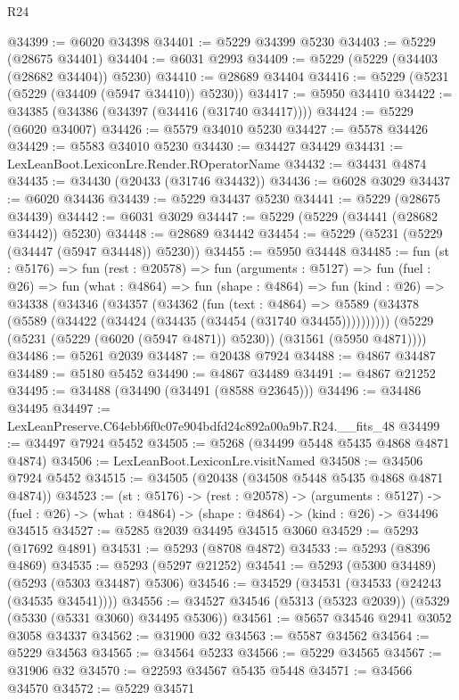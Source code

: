 \begin{lexlean}{R24}
\begin{coremodule}
@34399 := @6020 @34398
@34401 := @5229 @34399 @5230
@34403 := @5229 (@28675 @34401)
@34404 := @6031 @2993
@34409 := @5229 (@5229 (@34403 (@28682 @34404)) @5230)
@34410 := @28689 @34404
@34416 := @5229 (@5231 (@5229 (@34409 (@5947 @34410)) @5230))
@34417 := @5950 @34410
@34422 := @34385 (@34386 (@34397 (@34416 (@31740 @34417))))
@34424 := @5229 (@6020 @34007)
@34426 := @5579 @34010 @5230
@34427 := @5578 @34426
@34429 := @5583 @34010 @5230
@34430 := @34427 @34429
@34431 := LexLeanBoot.LexiconLre.Render.ROperatorName
@34432 := @34431 @4874
@34435 := @34430 (@20433 (@31746 @34432))
@34436 := @6028 @3029
@34437 := @6020 @34436
@34439 := @5229 @34437 @5230
@34441 := @5229 (@28675 @34439)
@34442 := @6031 @3029
@34447 := @5229 (@5229 (@34441 (@28682 @34442)) @5230)
@34448 := @28689 @34442
@34454 := @5229 (@5231 (@5229 (@34447 (@5947 @34448)) @5230))
@34455 := @5950 @34448
@34485 := fun (st : @5176) =>
  fun (rest : @20578) =>
  fun (arguments : @5127) =>
  fun (fuel : @26) =>
  fun (what : @4864) =>
  fun (shape : @4864) =>
  fun (kind : @26) =>
  @34338
    (@34346
      (@34357
        (@34362
          (fun (text : @4864) =>
          @5589 (@34378 (@5589 (@34422 (@34424 (@34435 (@34454 (@31740 @34455))))))))))
      (@5229 (@5231 (@5229 (@6020 (@5947 @4871)) @5230)) (@31561 (@5950 @4871))))
@34486 := @5261 @2039
@34487 := @20438 @7924
@34488 := @4867 @34487
@34489 := @5180 @5452
@34490 := @4867 @34489
@34491 := @4867 @21252
@34495 := @34488 (@34490 (@34491 (@8588 @23645)))
@34496 := @34486 @34495
@34497 := LexLeanPreserve.C64ebb6f0c07e904bdfd24c892a00a9b7.R24.__fits_48
@34499 := @34497 @7924 @5452
@34505 := @5268 (@34499 @5448 @5435 @4868 @4871 @4874)
@34506 := LexLeanBoot.LexiconLre.visitNamed
@34508 := @34506 @7924 @5452
@34515 := @34505 (@20438 (@34508 @5448 @5435 @4868 @4871 @4874))
@34523 := (st : @5176) ->
  (rest : @20578) ->
  (arguments : @5127) ->
  (fuel : @26) -> (what : @4864) -> (shape : @4864) -> (kind : @26) -> @34496 @34515
@34527 := @5285 @2039 @34495 @34515 @3060
@34529 := @5293 (@17692 @4891)
@34531 := @5293 (@8708 @4872)
@34533 := @5293 (@8396 @4869)
@34535 := @5293 (@5297 @21252)
@34541 := @5293 (@5300 @34489) (@5293 (@5303 @34487) @5306)
@34546 := @34529 (@34531 (@34533 (@24243 (@34535 @34541))))
@34556 := @34527 @34546 (@5313 (@5323 @2039)) (@5329 (@5330 (@5331 @3060) @34495 @5306))
@34561 := @5657 @34546 @2941 @3052 @3058 @34337
@34562 := @31900 @32
@34563 := @5587 @34562
@34564 := @5229 @34563
@34565 := @34564 @5233
@34566 := @5229 @34565
@34567 := @31906 @32
@34570 := @22593 @34567 @5435 @5448
@34571 := @34566 @34570
@34572 := @5229 @34571

\end{coremodule}
\end{lexlean}
